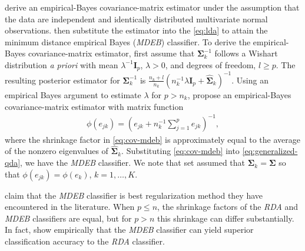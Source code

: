 \documentclass[11pt]{article}
\begin{document}
\cite{Srivastava:2007ww} derive an empirical-Bayes covariance-matrix estimator under the assumption that the data are independent and identically distributed multivariate normal observations. \cite{Srivastava:2007ww} then substitute the estimator into the \eqref{eq:lda} to attain the minimum distance empirical Bayes (\emph{MDEB}) classifier. To derive the empirical-Bayes covariance-matrix estimator, \cite{Srivastava:2007ww} first assume that $\bm \Sigma_k^{-1}$ follows a Wishart distribution \emph{a priori} with mean $\lambda^{-1} \bm I_p$, $\lambda > 0$, and degrees of freedom, $l \ge p$. The resulting posterior estimator for $\bm \Sigma_k^{-1}$ is $\frac{n_k + l}{n_k}(n_k^{-1}\lambda \bm I_p + \widehat{\bm \Sigma}_k)^{-1}$. Using an empirical Bayes argument to estimate $\lambda$ for $p > n_k$, \cite{Srivastava:2007ww} propose an empirical-Bayes covariance-matrix estimator with matrix function
\begin{align}
	\phi(e_{jk}) = \left(e_{jk} + n_k^{-1} \sum_{j = 1}^p e_{jk}\right)^{-1},\label{eq:cov-mdeb}
\end{align}
where the shrinkage factor in \eqref{eq:cov-mdeb} is approximately equal to the average of the nonzero eigenvalues of $\widehat{\bm \Sigma}_k$. Substituting \eqref{eq:cov-mdeb} into \eqref{eq:generalized-qda}, we have the \emph{MDEB} classifier. We note that \cite{Srivastava:2007ww} set assumed that $\bm \Sigma_k = \bm \Sigma$ so that $\phi(e_{jk}) = \phi(e_k)$, $k = 1, \ldots, K$.

\cite{Srivastava:2007ww} claim that the \emph{MDEB} classifier is best regularization method they have encountered in the literature. When $p \le n$, the shrinkage factors of the \emph{RDA} and \emph{MDEB} classifiers are equal, but for $p > n$ this shrinkage can differ substantially. In fact, \cite{Ramey:2011ji} show empirically that the \emph{MDEB} classifier can yield superior classification accuracy to the \emph{RDA} classifier.
\end{document}
